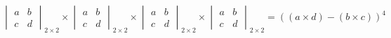 \documentclass[border=2pt,varwidth=true]{standalone}
\begin{document}
\begin{displaymath}
\begin{vmatrix} a & b \\ c & d \end{vmatrix}_{2 \times 2} \times \begin{vmatrix} a & b \\ c & d \end{vmatrix}_{2 \times 2} \times \begin{vmatrix} a & b \\ c & d \end{vmatrix}_{2 \times 2} \times \begin{vmatrix} a & b \\ c & d \end{vmatrix}_{2 \times 2} = ((a \times d) - (b \times c))^4
\end{displaymath}
\end{document}
